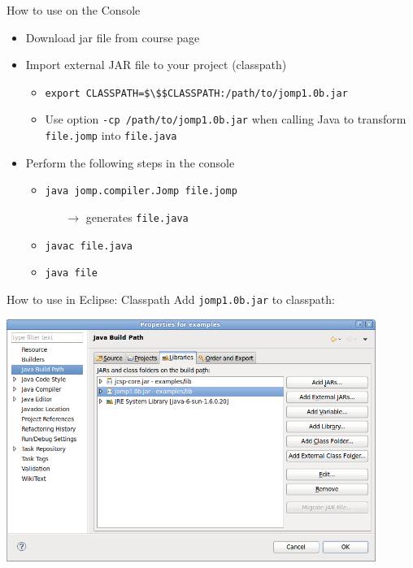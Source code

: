 \begin{frame}{How to use on the Console}
  \begin{itemize}
  \item Download jar file from course page
  \item Import external JAR file to your project (classpath)
    \begin{itemize}
    \item \lstinline!export CLASSPATH=$\$$CLASSPATH:/path/to/jomp1.0b.jar!
    \item Use option \lstinline!-cp /path/to/jomp1.0b.jar! when
      calling Java to transform \lstinline!file.jomp! into
      \lstinline!file.java!
    \end{itemize}
  \item Perform the following steps in the console
    \begin{itemize}
    \item \lstinline!java jomp.compiler.Jomp file.jomp!
      \begin{itemize}
      \item[$\rightarrow$] generates \lstinline!file.java!
      \end{itemize}
    \item \lstinline!javac file.java!
    \item \lstinline!java file!
    \end{itemize}
  \end{itemize}
\end{frame}

\begin{frame}{How to use in Eclipse: Classpath}
  Add \lstinline!jomp1.0b.jar! to classpath:


  \begin{center}
    \includegraphics[width=0.9\textwidth]{figures/jomp-properties}
  \end{center}
\end{frame}

